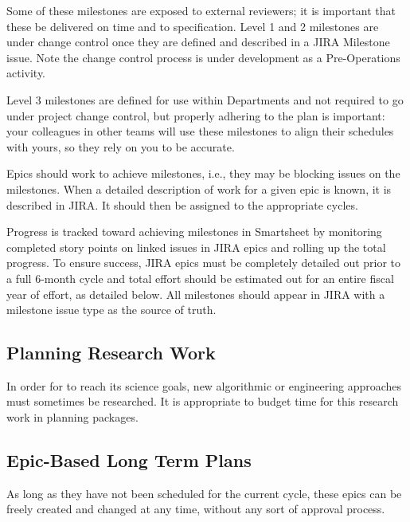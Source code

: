 Some of these milestones are exposed to external reviewers; it is important that these be delivered on time and to specification.
Level 1 and 2 milestones are under change control once they are defined and described in a \gls{JIRA} Milestone issue. Note the change control process is under development as a Pre-Operations activity.

Level 3 milestones are defined for use within Departments and not required to go under project change control, but properly adhering to the plan is important: your colleagues in other teams will use these milestones to align their schedules with yours, so they rely on you to be accurate.

Epics should work to achieve milestones, i.e., they may be blocking issues on the milestones.
When a detailed description of work for a given \gls{epic} is known, it is described in \gls{JIRA}.
It should then be assigned to the appropriate \glspl{cycle}.

Progress is tracked toward achieving milestones in Smartsheet by \gls{monitoring} completed \gls{story} points on linked issues in \gls{JIRA} epics and rolling up the total progress.
To ensure success, \gls{JIRA} epics must be completely detailed out prior to a full 6-month \gls{cycle} and total effort should be estimated out for an entire fiscal year of effort, as detailed below.
All milestones should appear in \gls{JIRA} with a milestone issue type as the source of truth.

\subsection{Planning Research Work}
\label{sec:long-term-research}

In order for \RO  to reach its science goals, new algorithmic or engineering approaches must sometimes be researched.
It is appropriate to budget time for this research work in planning packages.

\subsection{Epic-Based Long Term Plans}

As long as they have not been scheduled for the current \gls{cycle}, these \glspl{epic} can be freely created and changed at any time, without any sort of approval process.

